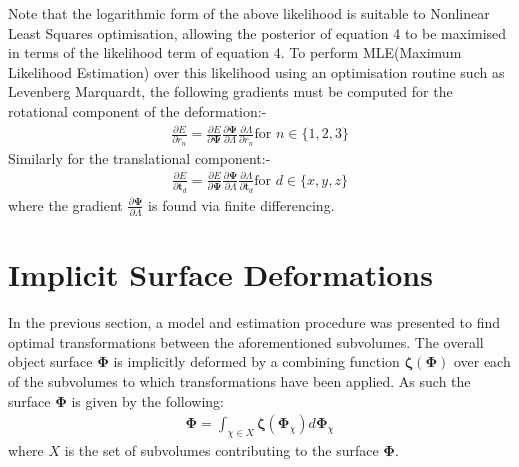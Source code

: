 Note that the logarithmic form of the above likelihood is suitable to Nonlinear Least Squares optimisation, allowing the posterior of equation 4 
to be maximised in terms of the likelihood term of equation 4. To perform MLE(Maximum Likelihood Estimation) over this likelihood using 
an optimisation routine such as Levenberg Marquardt, the following gradients must be computed for the rotational component of the 
deformation:-
\begin{equation}
\begin{split}
\frac{\partial E}{\partial r_{n}} = \frac{\partial E}{\partial \mathbf{\Psi}} \frac{\partial \mathbf{\Psi}}{\partial \Lambda} \frac{\partial \Lambda}{\partial r_{n}} \text{for } n \in \{1,2,3\}
\end{split}
\end{equation}
Similarly for the translational component:-
\begin{equation}
\begin{split}
\frac{\partial E}{\partial \mathbf{t}_{d}} = \frac{\partial E}{\partial \mathbf{\Psi}} \frac{\partial \mathbf{\Psi}}{\partial \Lambda} \frac{\partial \Lambda}{\partial \mathbf{t}_{d}} \text{for } d \in  \{x,y,z\}
\end{split}
\end{equation}
where the gradient $\frac{\partial \mathbf{\Psi}}{\partial \Lambda}$ is found via finite differencing.

\section{Implicit Surface Deformations}
In the previous section, a model and estimation procedure was presented to find optimal transformations between the aforementioned subvolumes.
The overall object surface $\mathbf{\Phi}$ is implicitly deformed by a combining function $\mathbf{\zeta}(\mathbf{\Phi})$ over each of the subvolumes to which transformations have been applied.
As such the surface $\mathbf{\Phi}$ is given by the following:
\begin{equation}
\begin{split}
\mathbf{\Phi} = \int_{\chi \in X} \mathbf{\zeta}(\mathbf{\Phi}_{\chi}) d \mathbf{\Phi}_{\chi}
\end{split}
\end{equation}
where $X$ is the set of subvolumes contributing to the surface $\mathbf{\Phi}$.

